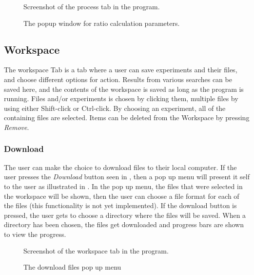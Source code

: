 \begin{figure}[htb]
	\caption{Screenshot of the process tab in the program.}
	\label{fig:des_process-view}
\end{figure}

\begin{figure}[htb]
	\caption{The popup window for ratio calculation parameters.}
	\label{fig:des_process-view-ratio}
\end{figure}

\FloatBarrier

\subsection{Workspace} \label{sec:des_workspace}
The workspace Tab is a tab where a user can save experiments and their files, and choose different options for action. Results from various searches can be saved here, and the contents of the workspace is saved as long as the program is running. Files and/or experiments is chosen by clicking them, multiple files by using either Shift-click or Ctrl-click. By choosing an experiment, all of the containing files are selected. Items can be deleted from the Workspace by pressing \emph{Remove}.
\subsubsection{Download}
The user can make the choice to download files to their local computer. If the user presses the \emph{Download} button seen in , then a pop up menu will present it self to the user as illustrated in . In the pop up menu, the files that were selected in the workspace will be shown, then the user can choose a file format for each of the files (this functionality is not yet implemented). If the download button is pressed, the user gets to choose a directory where the files will be saved. When a directory has been chosen, the files get downloaded and progress bars are shown to view the progress.
\begin{figure}[htb]
	\caption{Screenshot of the workspace tab in the program.}
	\label{fig:des_workspace-view}
\end{figure}
\begin{figure}[htb]
	\caption{The download files pop up menu}
	\label{fig:des_download-view}
\end{figure}
\FloatBarrier

